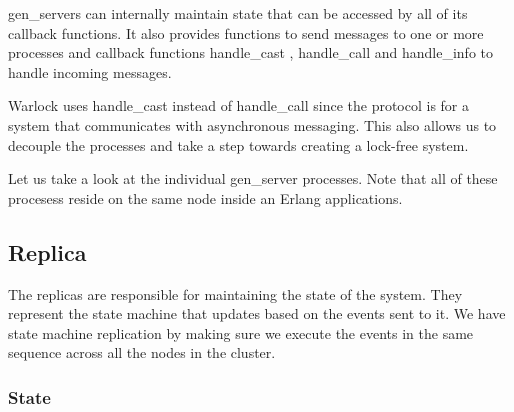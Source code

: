 gen\_servers can internally maintain state that can be accessed by all of its
callback functions. It also provides functions to send messages%
to one or more processes and callback functions handle\_cast%
, handle\_call%
 and handle\_info%
to handle incoming messages.

Warlock uses handle\_cast instead of handle\_call since the protocol is for
a system that communicates with asynchronous messaging. This also allows us
to decouple the processes and take a step towards creating a lock-free system.

Let us take a look at the individual gen\_server processes. Note that all of
these procesess reside on the same node inside an Erlang applications.

\subsection{Replica}

The replicas are responsible for maintaining the state of the system. They
represent the state machine that updates based on the events sent to it. We
have state machine replication by making sure we execute the events in the same
sequence across all the nodes in the cluster.

\subsubsection{State}

